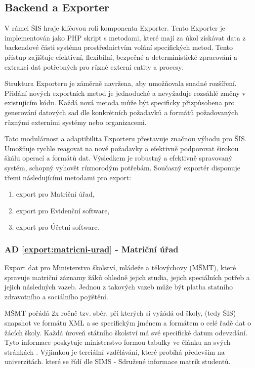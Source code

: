 \documentclass[FM,Proj]{tulthesis}
\begin{document}
\subsection{Backend a Exporter}
\label{section:backend-a-exporter}
V rámci ŠIS hraje klíčovou roli komponenta Exporter. Tento Exporter je implementován
jako PHP skript s metodami, které mají za úkol získávat data z backendové části 
systému prostřednictvím volání specifických metod. Tento přístup zajišťuje efektivní,
flexibilní, bezpečné a deterministické zpracování a extrakci dat potřebných pro různé
externí entity a procesy.

Struktura Exporteru je záměrně navržena, aby umožňovala snadné rozšíření. Přidání
nových exportních metod je jednoduché a nevyžaduje rozsáhlé změny v existujícím kódu.
Každá nová metoda může být specificky přizpůsobena pro generování datových sad
dle konkrétních požadavků a formátů požadovaných různými externími systémy nebo
organizacemi.

Tato modulárnost a adaptibilita Exporteru přestavuje značnou výhodu pro ŠIS. Umožňuje
rychle reagovat na nové požadavky a efektivně podporovat širokou škálu operací
a formátů dat. Výsledkem je robustný a efektivně spravovaný systém, schopný vyhovět
různorodým potřebám. Současný exportér disponuje třemi následujícími metodami
pro export:
\begin{enumerate}
    \item\label{export:matricni-urad} export pro Matriční úřad,
    \item\label{export:evidencni-software} export pro Evidenční software,
    \item\label{export:ucetni-software} export pro Účetní software.
\end{enumerate}

\subsubsection*{AD \ref{export:matricni-urad} - Matriční úřad}
Export dat pro Ministerstvo školství, mládeže a tělovýchovy (MŠMT), které spravuje matriční 
záznamy žáků ohledně jejich studia, jejich speciálních potřeb a jejich následných vazeb.
Jednou z takových vazeb může být platba statního zdravotního a sociálního pojištění.

MŠMT pořádá 2x ročně tzv. sběr\cite{skolni-matrika}, při kterých si vyžádá od školy,
(tedy ŠIS) snapshot ve formátu XML a se specifickým jménem a formátem o celé řadě 
dat o žácích školy. Každá úroveň státního školství má své specifické datum odevzdání.
Tyto informace poskytuje ministerstvo formou tabulky ve článku na svých stránkách
\cite{msmt-terminy-predavani-dat-2023}. Výjimkou je terciální vzdělávání, které probíhá
především na univerzitách. které se řídí dle SIMS - Sdružené informace matrik studentů.
\end{document}
